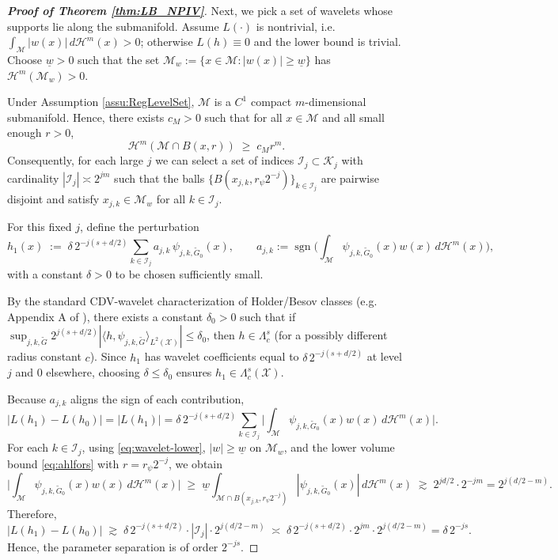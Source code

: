 \documentclass[12pt,american]{article}
\DeclareMathOperator{\sgn}{sgn}
\theoremstyle{definition}
\theoremstyle{plain}
\theoremstyle{definition}
\theoremstyle{plain}
\theoremstyle{plain}
\theoremstyle{plain}
\theoremstyle{plain}
\theoremstyle{plain}
\begin{document}
\begin{proof}[\textbf{Proof of Theorem \ref{thm:LB_NPIV}}]
Next, we pick a set of wavelets whose supports lie along the submanifold.
Assume $L(\cdot)$ is nontrivial, i.e.
$\int_{\mathcal M} |w(x)|\,d\mathcal H^m(x)>0$; otherwise $L(h)\equiv 0$ and the lower bound is trivial.
Choose $\underline w>0$ such that the set
$\mathcal M_w:=\{x\in\mathcal M:|w(x)|\geq \underline w\}$ has $\mathcal H^m(\mathcal M_w)>0$.

Under Assumption \ref{assu:RegLevelSet}, $\mathcal M$ is a $C^1$ compact $m$-dimensional submanifold. Hence,
there exists $c_M>0$ such that for all $x\in\mathcal M$ and all small enough
$r>0$,
\begin{equation}\label{eq:ahlfors}
\mathcal H^m(\mathcal M\cap B(x,r)) \;\ge\; c_M r^m.
\end{equation}
Consequently, for each large $j$ we can select a set of indices $\mathcal I_j\subset \mathcal K_j$ with
cardinality $|\mathcal I_j|\asymp 2^{jm}$ such that the balls
$\{B(x_{j,k},r_\psi 2^{-j})\}_{k\in\mathcal I_j}$ are pairwise disjoint and satisfy
$x_{j,k}\in \mathcal M_w$ for all $k\in\mathcal I_j$.

For this fixed $j$, define the perturbation
\begin{equation}\label{eq:h1-def}
h_1(x) \;:=\; \delta\,2^{-j(s+d/2)}\sum_{k\in\mathcal I_j} a_{j,k}\,\psi_{j,k,\tilde G_0}(x),
\qquad
a_{j,k}:=\sgn\!\Big(\int_{\mathcal M}\psi_{j,k,\tilde G_0}(x)w(x)\,d\mathcal H^m(x)\Big),
\end{equation}
with a constant $\delta>0$ to be chosen sufficiently small.

By the standard CDV-wavelet characterization of Holder/Besov classes
(e.g. Appendix A of \cite{chen2018optimal}), there exists a constant $\delta_0>0$ such that
if $\sup_{j,k,\tilde G} 2^{j(s+d/2)}|\langle h,\psi_{j,k,\tilde G}\rangle_{L^2(\mathcal X)}|\leq \delta_0$,
then $h\in \Lambda_c^s$ (for a possibly different radius constant $c$).
Since $h_1$ has wavelet coefficients equal to $\delta\,2^{-j(s+d/2)}$ at level $j$ and $0$ elsewhere,
choosing $\delta\le\delta_0$ ensures $h_1\in\Lambda_c^s(\mathcal X)$.

Because $a_{j,k}$ aligns the sign of each contribution,
\[
|L(h_1)-L(h_0)|
=|L(h_1)|
=\delta\,2^{-j(s+d/2)}\sum_{k\in\mathcal I_j}\Big|\int_{\mathcal M}\psi_{j,k,\tilde G_0}(x)w(x)\,d\mathcal H^m(x)\Big|.
\]
For each $k\in\mathcal I_j$, using \eqref{eq:wavelet-lower}, $|w|\ge \underline w$ on $\mathcal M_w$,
and the lower volume bound \eqref{eq:ahlfors} with $r=r_\psi 2^{-j}$, we obtain
\[
\Big|\int_{\mathcal M}\psi_{j,k,\tilde G_0}(x)w(x)\,d\mathcal H^m(x)\Big|
\;\ge\;
\underline w\int_{\mathcal M\cap B(x_{j,k},r_\psi 2^{-j})} |\psi_{j,k,\tilde G_0}(x)|\,d\mathcal H^m(x)
\;\gtrsim\;
2^{jd/2}\cdot 2^{-jm}
=
2^{j(d/2-m)}.
\]
Therefore,
\[
|L(h_1)-L(h_0)|
\;\gtrsim\;
\delta\,2^{-j(s+d/2)}\cdot |\mathcal I_j|\cdot 2^{j(d/2-m)}
\;\asymp\;
\delta\,2^{-j(s+d/2)}\cdot 2^{jm}\cdot 2^{j(d/2-m)}
=
\delta\,2^{-js}.
\]
Hence, the parameter separation is of order $2^{-js}$.


\end{proof}
\end{document}
